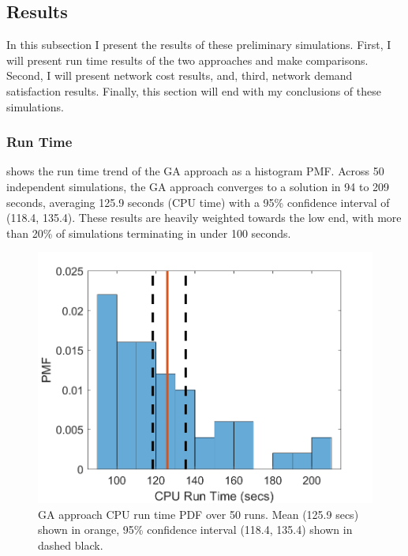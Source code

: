 \documentclass[12pt,dvipsnames]{report}
\begin{document}
\subsection{Results} \label{subsec:prelim_results}

In this subsection I present the results of these preliminary simulations.  First, I will present run time results of the two approaches and make comparisons.  Second, I will present network cost results, and, third, network demand satisfaction results.  Finally, this section will end with my conclusions of these simulations.

\subsubsection{Run Time}

 shows the run time trend of the GA approach as a histogram PMF.  Across 50 independent simulations, the GA approach converges to a solution in 94 to 209 seconds, averaging 125.9 seconds (CPU time) with a 95\% confidence interval of (118.4, 135.4).  These results are heavily weighted towards the low end, with more than 20\% of simulations terminating in under 100 seconds.

\begin{figure}[ht]
	\centering
	\includegraphics[height=0.45\textheight]{Figures/Prelim_GARuntime50}
	\caption[Preliminary simulations GA CPU run time PDF]{GA approach CPU run time PDF over 50 runs.  Mean (125.9 secs) shown in orange, 95\% confidence interval (118.4, 135.4) shown in dashed black.}
	\label{fig:Prelim_GARunTime}
\end{figure}
\end{document}
